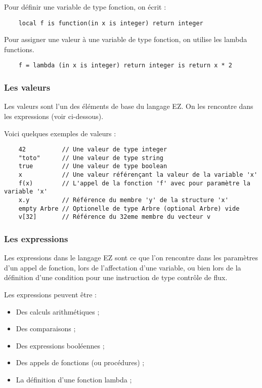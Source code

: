Pour définir une variable de type fonction, on écrit :
\begin{verbatim}
    local f is function(in x is integer) return integer
\end{verbatim}

Pour assigner une valeur à une variable de type fonction, on utilise les lambda
functions.
\begin{verbatim}
    f = lambda (in x is integer) return integer is return x * 2
\end{verbatim}


\subsubsection{Les valeurs}

Les valeurs sont l'un des éléments de base du langage EZ. On les rencontre
dans les expressions (voir ci-dessous).

Voici quelques exemples de valeurs :
\begin{verbatim}
    42          // Une valeur de type integer
    "toto"      // Une valeur de type string
    true        // Une valeur de type boolean
    x           // Une valeur référençant la valeur de la variable 'x'
    f(x)        // L'appel de la fonction 'f' avec pour paramètre la variable 'x'
    x.y         // Référence du membre 'y' de la structure 'x'
    empty Arbre // Optionelle de type Arbre (optional Arbre) vide
    v[32]       // Référence du 32eme membre du vecteur v
\end{verbatim}


\subsubsection{Les expressions}

Les expressions dans le langage EZ sont ce que l'on rencontre dans les
paramètres d'un appel de fonction, lors de l'affectation d'une variable, ou
bien lors de la définition d'une condition pour une instruction de type
contrôle de flux.

Les expressions peuvent être :
\begin{itemize}
    \item Des calculs arithmétiques ;
    \item Des comparaisons ;
    \item Des expressions booléennes ;
    \item Des appels de fonctions (ou procédures) ;
    \item La définition d'une fonction lambda ;
\end{itemize}

